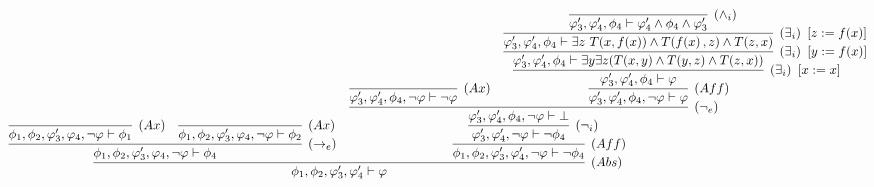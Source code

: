 \documentclass[a4paper,french,bookmarks]{book}
\begin{document}
\begin{landscape}
\[{{{{{{{{{{{{{{{{                }{
                    \infer[(Abs)]{
                        \phi_1, \phi_2, \varphi_3', \varphi_4' \vdash \varphi
                    }{
                        \infer[(\rightarrow_e)]{
                            \phi_1, \phi_2, \varphi_3', \varphi_4, \neg \varphi \vdash \phi_4
                        }{
                            \infer[(Ax)]{
                                \phi_1, \phi_2, \varphi_3', \varphi_4, \neg \varphi \vdash \phi_1
                            }{} &
                            \infer[(Ax)]{
                                \phi_1, \phi_2, \varphi_3', \varphi_4, \neg \varphi \vdash \phi_2
                            }{}
                        } &
                        \infer[(Aff)]{
                            \phi_1, \phi_2, \varphi_3', \varphi_4', \neg \varphi \vdash \neg \phi_4
                        }{
                            \infer[(\neg_i)]{
                                \varphi_3', \varphi_4', \neg \varphi \vdash \neg \phi_4
                            }{
                                \infer[(\neg_e)]{
                                    \varphi_3', \varphi_4', \phi_4, \neg \varphi \vdash \bot
                                }{
                                    \infer[(Ax)]{
                                        \varphi_3', \varphi_4', \phi_4, \neg \varphi \vdash \neg \varphi
                                    }{} &
                                    \infer[(Aff)]{
                                        \varphi_3', \varphi_4', \phi_4, \neg \varphi \vdash \varphi
                                    }{
                                        \infer[(\exists_i) \ \intc{x := x}]{
                                            \varphi_3', \varphi_4', \phi_4 \vdash \varphi
                                        }{
                                            \infer[(\exists_i) \ \intc{y := f\p{x}}]{
                                                \varphi_3', \varphi_4', \phi_4 \vdash \exists y \exists z \p{T\p{x, y} \land T\p{y, z} \land T\p{z, x}}
                                            }{
                                                \infer[(\exists_i) \ \intc{z := f\p{x}}]{
                                                     \varphi_3', \varphi_4', \phi_4 \vdash \exists z \ T\p{x, f\p{x}} \land T\p{f\p{x}, z} \land T\p{z, x}
                                                }{
                                                    \infer[(\land_i)]{
                                                        \varphi_3', \varphi_4', \phi_4 \vdash \varphi_4' \land \phi_4 \land \varphi_3'
                                                    }{
}}}}}}}}}}}}}}}}}}}}}}}}}\]
\end{landscape}
\end{document}
